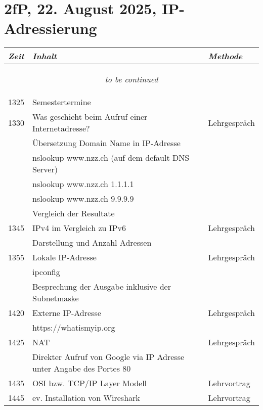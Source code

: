 \documentclass[a4paper]{scrreprt}
\begin{document}
\section*{2fP, 22. August 2025, IP-Adressierung}
\begin{longtable}{p{1.5cm}>{\RaggedRight}p{7.5cm}p{2.5cm}}
    \toprule
    \emph{Zeit}&\emph{Inhalt}&\emph{Methode}\\
    \midrule
    \endhead

    \midrule
    \multicolumn{3}{c}{\begin{tiny}\textit{to be continued}\end{tiny}}\\
    \midrule
    \endfoot

    \bottomrule
    \endlastfoot

    1325&Semestertermine&\\ [5pt]

    1330&Was geschieht beim Aufruf einer Internetadresse?&Lehrgespräch\\
        &Übersetzung Domain Name in IP-Adresse&\\
        &nslookup www.nzz.ch (auf dem default DNS Server)&\\
        &nslookup www.nzz.ch 1.1.1.1&\\
        &nslookup www.nzz.ch 9.9.9.9&\\
        &Vergleich der Resultate&\\ [5pt]

    1345&IPv4 im Vergleich zu IPv6&Lehrgespräch\\
        &Darstellung und Anzahl Adressen&\\ [5pt]

    1355&Lokale IP-Adresse&Lehrgespräch\\
        &ipconfig&\\
        &Besprechung der Ausgabe inklusive der Subnetmaske&\\ [5pt]

    1420&Externe IP-Adresse&Lehrgespräch\\
        &https://whatismyip.org&\\ [5pt]

    1425&NAT&Lehrgespräch\\ [5pt]
        &Direkter Aufruf von Google via IP Adresse unter Angabe des
        Portes 80&\\ [5pt]

    1435&OSI bzw. TCP/IP Layer Modell&Lehrvortrag\\ [5pt]

    1445&ev. Installation von Wireshark&Lehrvortrag\\




\end{longtable}
\end{document}
